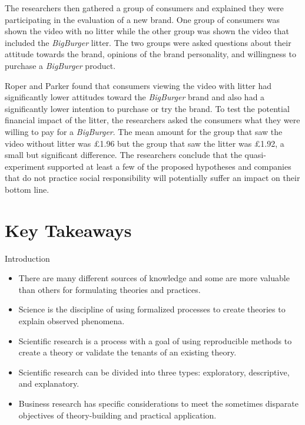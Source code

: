 The researchers then gathered a group of consumers and explained they were participating in the evaluation of a new brand. One group of consumers was shown the video with no litter while the other group was shown the video that included the \textit{BigBurger} litter. The two groups were asked questions about their attitude towards the brand, opinions of the brand personality, and willingness to purchase a \textit{BigBurger} product. 

Roper and Parker found that consumers viewing the video with litter had significantly lower attitudes toward the \textit{BigBurger} brand and also had a significantly lower intention to purchase or try the brand. To test the potential financial impact of the litter, the researchers asked the consumers what they were willing to pay for a \textit{BigBurger}. The mean amount for the group that saw the video without litter was \pounds1.96 but the group that saw the litter was \pounds1.92, a small but significant difference. The researchers conclude that the quasi-experiment supported at least a few of the proposed hypotheses and companies that do not practice social responsibility will potentially suffer an impact on their bottom line.

\section{Key Takeaways}

\begin{center}
	\begin{tkawybox}{Introduction}
		\begin{itemize}
			\item There are many different sources of knowledge and some are more valuable than others for formulating theories and practices.
			\item Science is the discipline of using formalized processes to create theories to explain observed phenomena.
			\item Scientific research is a process with a goal of using reproducible methods to create a theory or validate the tenants of an existing theory.
			\item Scientific research can be divided into three types: exploratory, descriptive, and explanatory.
			\item Business research has specific considerations to meet the sometimes disparate objectives of theory-building and practical application.
		\end{itemize}
	\end{tkawybox}
\end{center}
